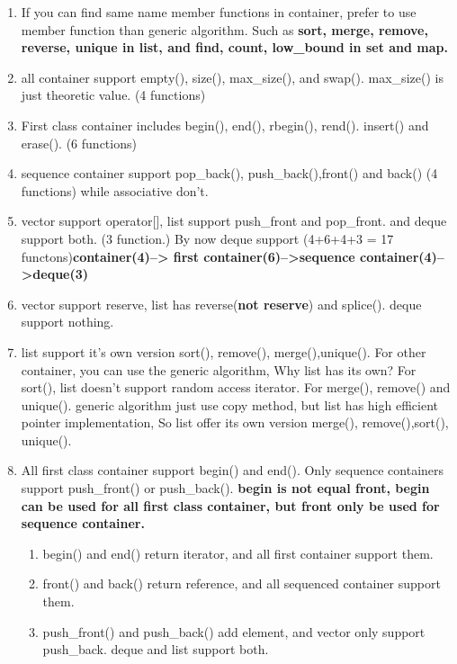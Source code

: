 \documentclass[a4paper,12pt,twoside]{book}
\begin{document}
\begin{itemize}
\begin{enumerate}
\item  If you can find same name member functions in container, prefer to use member function than generic algorithm. Such as \textbf{sort, merge, remove, reverse, unique in list, and find, count, low\_bound in set and map. }




\item all container support empty(), size(), max\_size(), and swap(). max\_size() is just theoretic value. (4  functions)
\item First class container includes begin(), end(), rbegin(), rend(). insert() and erase(). (6 functions)
\item sequence container support pop\_back(), push\_back(),front() and back() (4 functions)
 while associative don't.
\item vector support operator[], list support push\_front and pop\_front. and deque support both. (3 function.)  By now deque support (4+6+4+3 = 17 functons)\textbf{container(4)--> first container(6)-->sequence container(4)-->deque(3)}
\item vector support reserve, list has reverse(\textbf{not reserve}) and splice().  deque support nothing.
\item list support it's own  version sort(), remove(), merge(),unique(). For other container, you can use the generic algorithm, Why list has its own? For sort(), list doesn't support random access iterator. For merge(), remove() and unique(). generic algorithm just use copy method, but list has high efficient pointer implementation, So list offer its own version merge(), remove(),sort(), unique().

\item All first class container support begin() and end(). Only sequence containers support push\_front() or push\_back(). \textbf{begin is not equal front, begin can be used for all first class container, but front only be used for sequence container.}

\begin{enumerate}
\item begin() and end() return iterator, and all first container support them.
\item front() and back() return reference, and all sequenced container support them.
\item push\_front() and push\_back() add element, and vector only support push\_back. deque and list support both.
\end{enumerate}



\end{enumerate}
\end{itemize}
\end{document}

